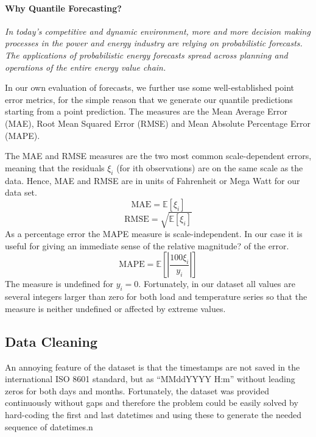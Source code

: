 \documentclass[conference]{IEEEtran}
\begin{document}
\paragraph{Why Quantile Forecasting?}
\textit{In today's competitive and dynamic environment, more and more decision making processes in the power and energy industry are relying on probabilistic forecasts. The applications of probabilistic energy forecasts spread across planning and operations of the entire energy value chain.}

In our own evaluation of forecasts, we further use some well-established point error metrics, for the simple reason that we generate our quantile predictions starting from a point prediction. The measures are the Mean Average Error (MAE), Root Mean Squared Error (RMSE) and Mean Absolute Percentage Error (MAPE).\par
The MAE and RMSE measures are the two most common scale-dependent errors, meaning that the residuals $\xi_i$ (for ith observations) are on the same scale as the data. Hence, MAE and RMSE are in units of Fahrenheit or Mega Watt for our data set. 
\[
  \text{MAE}=\mathbb{E}[\xi_i]
\]
\[
  \text{RMSE}=\sqrt{\mathbb{E}[\xi_i]}
\]
As a percentage error the MAPE measure is scale-independent. In our case it is useful for giving an immediate sense of the relative magnitude? of the error.
\[
  \text{MAPE}=\mathbb{E}\left[\left| \frac{100\xi_i}{y_i} \right|\right]
\]
The measure is undefined for $y_i=0$. Fortunately, in our dataset all values are several integers larger than zero for both load and temperature series so that the measure is neither undefined or affected by extreme values.

\subsection{Data Cleaning}
An annoying feature of the dataset is that the timestamps are not saved in the international ISO 8601 standard, but as ``MMddYYYY H:m'' without leading zeros for both days and months. Fortunately, the dataset was provided continuously without gaps and therefore the problem could be easily solved by hard-coding the first and last datetimes and using these to generate the needed sequence of datetimes.n
\end{document}
